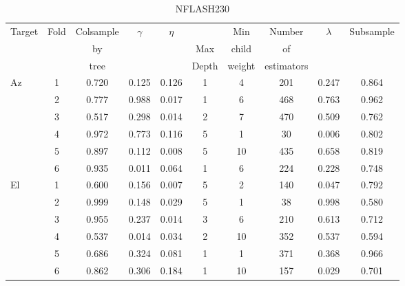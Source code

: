 \begin{table}[!htbp]
    \centering
    \caption{NFLASH230}
    \begin{tabular}{lccccccccc}
        \toprule
        \multirow{3}{*}{Target} & \multirow{3}{*}{Fold} &  Colsample &  \multirow{3}{*}{$\gamma$} &  \multirow{3}{*}{$\eta$} &   &  Min &  Number &  \multirow{3}{*}{$\lambda$} &  \multirow{3}{*}{Subsample} \\
        & & by   & & & Max   & child  & of         & & \\
        & & tree & & & Depth & weight & estimators & & \\
        \midrule
        \multirow{6}{*}{Az} &   1 &      0.720 &  0.125 &          0.126 &      1 &             4 &       201 &       0.247 &      0.864 \\
                            &   2 &      0.777 &  0.988 &          0.017 &      1 &             6 &       468 &       0.763 &      0.962 \\
                            &   3 &      0.517 &  0.298 &          0.014 &      2 &             7 &       470 &       0.509 &      0.762 \\
                            &   4 &      0.972 &  0.773 &          0.116 &      5 &             1 &        30 &       0.006 &      0.802 \\
                            &   5 &      0.897 &  0.112 &          0.008 &      5 &            10 &       435 &       0.658 &      0.819 \\
                            &   6 &      0.935 &  0.011 &          0.064 &      1 &             6 &       224 &       0.228 &      0.748 \\
        \hline
        \multirow{6}{*}{El} &   1 &      0.600 &  0.156 &          0.007 &      5 &             2 &       140 &       0.047 &      0.792 \\
                            &   2 &      0.999 &  0.148 &          0.029 &      5 &             1 &        38 &       0.998 &      0.580 \\
                            &   3 &      0.955 &  0.237 &          0.014 &      3 &             6 &       210 &       0.613 &      0.712 \\
                            &   4 &      0.537 &  0.014 &          0.034 &      2 &            10 &       352 &       0.537 &      0.594 \\
                            &   5 &      0.686 &  0.324 &          0.081 &      1 &             1 &       371 &       0.368 &      0.966 \\
                            &   6 &      0.862 &  0.306 &          0.184 &      1 &            10 &       157 &       0.029 &      0.701 \\
        \bottomrule
        \end{tabular}
\end{table}

